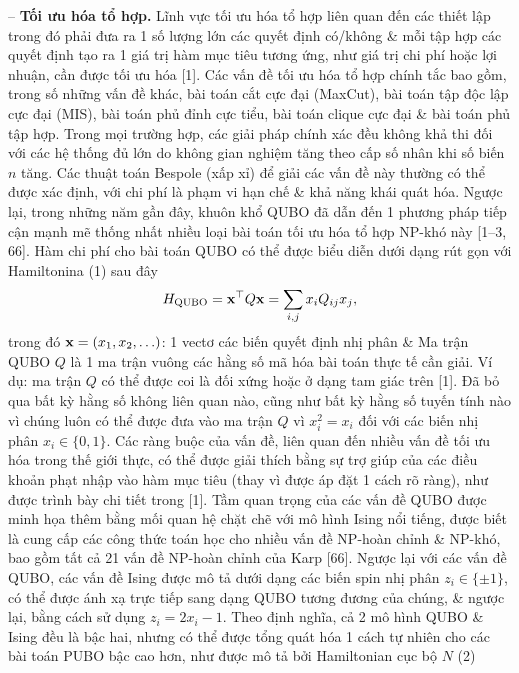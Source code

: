 \documentclass{article}
\begin{document}
\begin{itemize}
    -- {\bf Tối ưu hóa tổ hợp.} Lĩnh vực tối ưu hóa tổ hợp liên quan đến các thiết lập trong đó phải đưa ra 1 số lượng lớn các quyết định có/không \& mỗi tập hợp các quyết định tạo ra 1 giá trị hàm mục tiêu tương ứng, như giá trị chi phí hoặc lợi nhuận, cần được tối ưu hóa [1]. Các vấn đề tối ưu hóa tổ hợp chính tắc bao gồm, trong số những vấn đề khác, bài toán cắt cực đại (MaxCut), bài toán tập độc lập cực đại (MIS), bài toán phủ đỉnh cực tiểu, bài toán clique cực đại \& bài toán phủ tập hợp. Trong mọi trường hợp, các giải pháp chính xác đều không khả thi đối với các hệ thống đủ lớn do không gian nghiệm tăng theo cấp số nhân khi số biến $n$ tăng. Các thuật toán Bespole (xấp xỉ) để giải các vấn đề này thường có thể được xác định, với chi phí là phạm vi hạn chế \& khả năng khái quát hóa. Ngược lại, trong những năm gần đây, khuôn khổ QUBO đã dẫn đến 1 phương pháp tiếp cận mạnh mẽ thống nhất nhiều loại bài toán tối ưu hóa tổ hợp NP-khó này [1--3, 66]. Hàm chi phí cho bài toán QUBO có thể được biểu diễn dưới dạng rút gọn với Hamiltonina (1) sau đây
    \begin{equation*}
        H_{\rm QUBO} = {\bf x}^\top Q{\bf x} = \sum_{i,j} x_iQ_{ij}x_j,
    \end{equation*}
    trong đó ${\bf x} = (x_1,x_2,\ldots)$: 1 vectơ các biến quyết định nhị phân \& Ma trận QUBO $Q$ là 1 ma trận vuông các hằng số mã hóa bài toán thực tế cần giải. Ví dụ: ma trận $Q$ có thể được coi là đối xứng hoặc ở dạng tam giác trên [1]. Đã bỏ qua bất kỳ hằng số không liên quan nào, cũng như bất kỳ hằng số tuyến tính nào vì chúng luôn có thể được đưa vào ma trận $Q$ vì $x_i^2 = x_i$ đối với các biến nhị phân $x_i\in\{0,1\}$. Các ràng buộc của vấn đề, liên quan đến nhiều vấn đề tối ưu hóa trong thế giới thực, có thể được giải thích bằng sự trợ giúp của các điều khoản phạt nhập vào hàm mục tiêu (thay vì được áp đặt 1 cách rõ ràng), như được trình bày chi tiết trong [1]. Tầm quan trọng của các vấn đề QUBO được minh họa thêm bằng mối quan hệ chặt chẽ với mô hình Ising nổi tiếng, được biết là cung cấp các công thức toán học cho nhiều vấn đề NP-hoàn chỉnh \& NP-khó, bao gồm tất cả 21 vấn đề NP-hoàn chỉnh của Karp [66]. Ngược lại với các vấn đề QUBO, các vấn đề Ising được mô tả dưới dạng các biến spin nhị phân $z_i\in\{\pm1\}$, có thể được ánh xạ trực tiếp sang dạng QUBO tương đương của chúng, \& ngược lại, bằng cách sử dụng $z_i = 2x_i - 1$. Theo định nghĩa, cả 2 mô hình QUBO \& Ising đều là bậc hai, nhưng có thể được tổng quát hóa 1 cách tự nhiên cho các bài toán PUBO bậc cao hơn, như được mô tả bởi Hamiltonian cục bộ $N$ (2)

\end{itemize}
\end{document}
